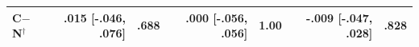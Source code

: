 \documentclass[letterpaper]{article} %
\begin{document}
\begin{table}[t!]
\begin{tabular}{@{}l rr rr rr@{}}
C$-$N\(^{\dagger}\) & .015 [-.046, .076] & .688 & .000 [-.056, .056] & 1.00 & -.009 [-.047, .028] & .828\\ %
\bottomrule
\end{tabular}

\medskip


\end{table}
\end{document}
